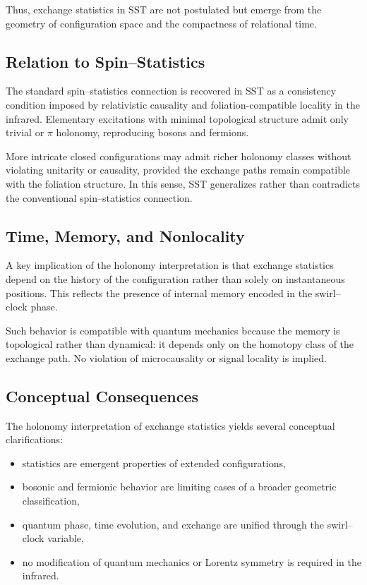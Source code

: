 \documentclass[11pt]{article}
\begin{document}
            Thus, exchange statistics in SST are not postulated but emerge from the geometry
            of configuration space and the compactness of relational time.

        \subsection{Relation to Spin--Statistics}

            The standard spin--statistics connection is recovered in SST as a consistency
            condition imposed by relativistic causality and foliation-compatible locality
            in the infrared.
            Elementary excitations with minimal topological structure admit only trivial or
            $\pi$ holonomy, reproducing bosons and fermions.

            More intricate closed configurations may admit richer holonomy classes without
            violating unitarity or causality, provided the exchange paths remain compatible
            with the foliation structure.
            In this sense, SST generalizes rather than contradicts the conventional
            spin--statistics connection.

        \subsection{Time, Memory, and Nonlocality}

            A key implication of the holonomy interpretation is that exchange statistics
            depend on the history of the configuration rather than solely on instantaneous
            positions.
            This reflects the presence of internal memory encoded in the swirl--clock phase.

            Such behavior is compatible with quantum mechanics because the memory is
            topological rather than dynamical: it depends only on the homotopy class of the
            exchange path.
            No violation of microcausality or signal locality is implied.

        \subsection{Conceptual Consequences}

            The holonomy interpretation of exchange statistics yields several conceptual
            clarifications:
            \begin{itemize}
                \item statistics are emergent properties of extended configurations,
                \item bosonic and fermionic behavior are limiting cases of a broader geometric
                classification,
                \item quantum phase, time evolution, and exchange are unified through the
                swirl--clock variable,
                \item no modification of quantum mechanics or Lorentz symmetry is required in
                the infrared.
            \end{itemize}
\end{document}
